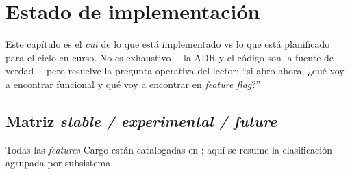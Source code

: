\chapter{Estado de implementación}
\label{sec:estado}

Este capítulo es el \emph{cut} de lo que está implementado vs lo que
está planificado para el ciclo en curso. No es exhaustivo ---la
ADR y el código son la fuente de verdad--- pero resuelve la pregunta
operativa del lector: ``si abro  ahora, ¿qué voy a
encontrar funcional y qué voy a encontrar en \emph{feature flag}?''

\section{Matriz \emph{stable / experimental / future}}

Todas las \emph{features} Cargo están catalogadas en
; aquí se resume la clasificación
agrupada por subsistema.

